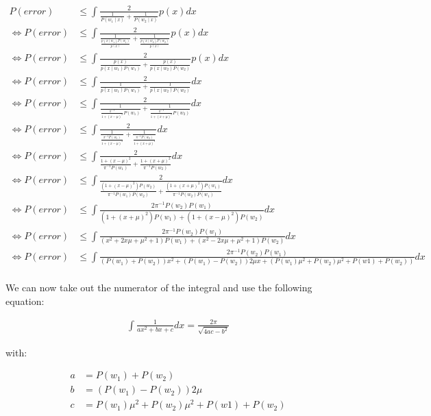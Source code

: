 \documentclass[10pt,a4paper]{article}
\begin{document}
\begin{align*}
	P(error) &\le \int \frac{2}{\frac{1}{P(w_1\mid x)} + \frac{1}{P(w_2 \mid x)}} p(x) dx \\
	\Leftrightarrow P(error) &\le \int \frac{2}{\frac{1}{ \frac{p(x \mid w_1)P(w_1)}{p(x)} } + \frac{1}{\frac{p(x \mid w_2)P(w_2)}{p(x)}}} p(x) dx \\
	\Leftrightarrow P(error) &\le \int \frac{2}{\frac{p(x)}{p(x \mid w_1)P(w_1)} + \frac{p(x)}{p(x \mid w_2)P(w_2)}} p(x) dx \\
	\Leftrightarrow P(error) &\le \int \frac{2}{\frac{1}{p(x \mid w_1)P(w_1)} + \frac{1}{p(x \mid w_2)P(w_2)}}dx \\
	\Leftrightarrow P(error) &\le \int \frac{2}{\frac{1}{ \frac{\pi^{-1}}{1+ (x - \mu)^2} P(w_1)} + \frac{1}{ \frac{\pi^{-1}}{1 + (x + \mu)^2} P(w_2)}}dx \\
	\Leftrightarrow P(error) &\le \int \frac{2}{\frac{1}{ \frac{\pi^{-1} P(w_1)}{1+ (x - \mu)^2}} + \frac{1}{ \frac{\pi^{-1} P(w_2)}{1 + (x + \mu)^2}}}dx \\
	\Leftrightarrow P(error) &\le \int \frac{2}{\frac{1+ (x - \mu)^2}{\pi^{-1} P(w_1)} +  \frac{1 + (x + \mu)^2}{\pi^{-1} P(w_2)}}dx \\
		\Leftrightarrow P(error) &\le \int \frac{2}{\frac{(1+ (x - \mu)^2) P(w_2)}{\pi^{-1} P(w_1) P(w_2)} +  \frac{(1 + (x + \mu)^2) P(w_1)}{\pi^{-1} P(w_2) P(w_1)}}dx \\
		\Leftrightarrow P(error) &\le \int \frac{2 \pi^{-1} P(w_2) P(w_1)}{(1+ (x + \mu)^2) P(w_1) + (1 + (x - \mu)^2) P(w_2)}dx \\
		\Leftrightarrow P(error) &\le \int \frac{2 \pi^{-1} P(w_2) P(w_1)}{(x^2 + 2x\mu +\mu^2 +1) P(w_1) + (x^2 - 2x\mu +\mu^2 +1) P(w_2)}dx \\
		\Leftrightarrow P(error) &\le \int \frac{2 \pi^{-1} P(w_2) P(w_1)}{(P(w_1)+P(w_2))x^2 + (P(w_1)-P(w_2))2\mu x + (P(w_1)\mu^2 + P(w_2)\mu^2+P(w1)+P(w_2))}dx \\
\end{align*}

We can now take out the numerator of the integral and use the following equation:

\begin{align}
\int \frac{1}{ax^2+bx+c}dx = \frac{2\pi}{\sqrt{4ac-b^2}}
\end{align}

with:

\begin{align*}
a &= P(w_1)+P(w_2) \\
b &= (P(w_1)-P(w_2))2\mu \\
c &= P(w_1)\mu^2 + P(w_2)\mu^2+P(w1)+P(w_2) \\
\end{align*}
\end{document}
